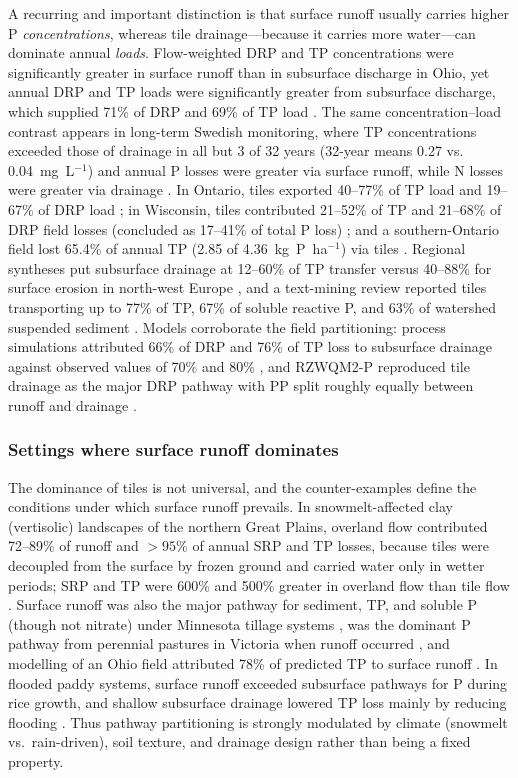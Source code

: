 \documentclass[11pt]{article}
\begin{document}
A recurring and important distinction is that surface runoff usually carries higher
P \emph{concentrations}, whereas tile drainage---because it carries more
water---can dominate annual \emph{loads}. Flow-weighted DRP and TP concentrations
were significantly greater in surface runoff than in subsurface discharge in Ohio,
yet annual DRP and TP loads were significantly greater from subsurface discharge,
which supplied 71\% of DRP and 69\% of TP load \parencite{Pease2018}. The same
concentration--load contrast appears in long-term Swedish monitoring, where TP
concentrations exceeded those of drainage in all but 3 of 32 years (32-year means
0.27 vs. 0.04~mg~L$^{-1}$) and annual P losses were greater via surface runoff,
while N losses were greater via drainage \parencite{Norberg2022}. In Ontario, tiles
exported 40--77\% of TP load and 19--67\% of DRP load
\parencite{VanEsbroeck2016}; in Wisconsin, tiles contributed 21--52\% of TP and
21--68\% of DRP field losses (concluded as 17--41\% of total P loss)
\parencite{Madison2014}; and a southern-Ontario field lost 65.4\% of annual TP
(2.85 of 4.36~kg~P~ha$^{-1}$) via tiles \parencite{Qi2018}. Regional syntheses put
subsurface drainage at 12--60\% of TP transfer versus 40--88\% for surface erosion
in north-west Europe \parencite{Ulén2007}, and a text-mining review reported tiles
transporting up to 77\% of TP, 67\% of soluble reactive P, and 63\% of watershed
suspended sediment \parencite{Elsayed2023}. Models corroborate the field
partitioning: process simulations attributed 66\% of DRP and 76\% of TP loss to
subsurface drainage against observed values of 70\% and 80\% \parencite{Grewal2025},
and RZWQM2-P reproduced tile drainage as the major DRP pathway with PP split roughly
equally between runoff and drainage \parencite{Sadhukhan2019b,Sadhukhan2019}.

\subsubsection{Settings where surface runoff dominates}

The dominance of tiles is not universal, and the counter-examples define the
conditions under which surface runoff prevails. In snowmelt-affected clay
(vertisolic) landscapes of the northern Great Plains, overland flow contributed
72--89\% of runoff and $>95\%$ of annual SRP and TP losses, because tiles were
decoupled from the surface by frozen ground and carried water only in wetter
periods; SRP and TP were 600\% and 500\% greater in overland flow than tile flow
\parencite{Kokulan2019b,Kokulan2021}. Surface runoff was also the major pathway for
sediment, TP, and soluble P (though not nitrate) under Minnesota tillage systems
\parencite{Zhao2001}, was the dominant P pathway from perennial pastures in Victoria
when runoff occurred \parencite{Melland2008}, and modelling of an Ohio field
attributed 78\% of predicted TP to surface runoff \parencite{Askar2021b}. In flooded
paddy systems, surface runoff exceeded subsurface pathways for P during rice growth,
and shallow subsurface drainage lowered TP loss mainly by reducing flooding
\parencite{DarziNaftchali2016}. Thus pathway partitioning is strongly modulated by
climate (snowmelt vs.\ rain-driven), soil texture, and drainage design rather than
being a fixed property.
\end{document}
